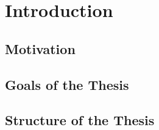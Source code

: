 \chapter{Introduction}
\label{chap:introduction}

\section{Motivation}

\section{Goals of the Thesis}

\section{Structure of the Thesis}
